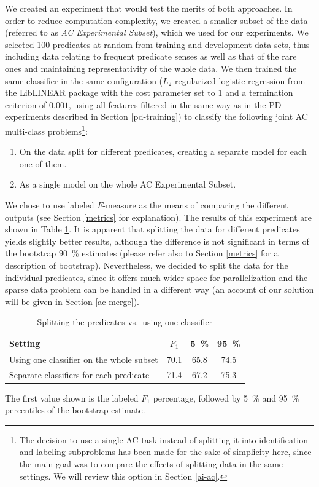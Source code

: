 \documentclass[12pt,notitlepage,a4paper]{report}
\begin{document}
We created an experiment that would test the merits of both approaches. In order to reduce computation complexity, we created a smaller subset of the data (referred to as \emph{AC Experimental Subset}), which we used for our experiments. We selected 100 predicates at random from training and development data sets, thus including data relating to frequent predicate senses as well as that of the rare ones and maintaining representativity of the whole data. We then trained the same classifier in the same configuration ($L_2$-regularized logistic regression from the LibLINEAR package with the cost parameter set to $1$ and a termination criterion of $0.001$, using all features filtered in the same way as in the PD experiments described in Section \ref{pd-training}) to classify the following joint AC multi-class problems\footnote{The decision to use a single AC task instead of splitting it into identification and labeling subproblems has been made for the sake of simplicity here, since the main goal was to compare the effects of splitting data in the same settings. We will review this option in Section \ref{ai-ac}.}:
\begin{enumerate}
    \item On the data split for different predicates, creating a separate model for each one of them.
    \item As a single model on the whole AC Experimental Subset.
\end{enumerate}
We chose to use labeled $F$-measure as the means of comparing the different outputs (see Section \ref{metrics} for explanation). The results of this experiment are shown in Table \ref{tab:one-bag}. It is apparent that splitting the data for different predicates yields slightly better results, although the difference is not significant in terms of the bootstrap 90~\% estimates (please refer also to Section \ref{metrics} for a description of bootstrap). Nevertheless, we decided to split the data for the individual predicates, since it offers much wider space for parallelization and the sparse data problem can be handled in a different way (an account of our solution will be given in Section \ref{ac-merge}).

\begin{table}[htb]\label{tab:one-bag}
\caption{Splitting the predicates vs.\ using one classifier}\footnotesize
\begin{center}
\begin{tabular}{|l|c|c|c|}\hline
\bf Setting & $F_1$ & \bf 5~\% & \bf 95~\% \\\hline
Using one classifier on the whole subset & 70.1 & 65.8 & 74.5 \\
Separate classifiers for each predicate &  71.4 & 67.2 & 75.3 \\\hline
\end{tabular}
\end{center}
The first value shown is the labeled $F_1$ percentage, followed by 5~\% and 95~\% percentiles of the bootstrap estimate.
\end{table}
\end{document}
